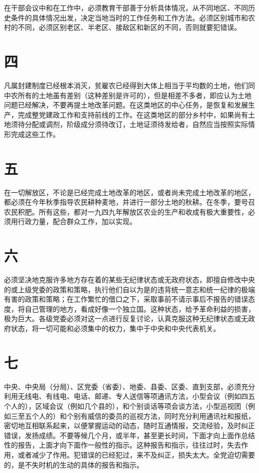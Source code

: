 在干部会议中和在工作中，必须教育干部善于分析具体情况，从不同地区、不同历史条件的具体情况出发，决定当地当时的工作任务和工作方法。必须区别城市和农村的不同，必须区别老区、半老区、接敌区和新区的不同，否则就要犯错误。

\section*{四}

凡属封建制度已经根本消灭，贫雇农已经得到大体上相当于平均数的土地，他们同中农所有的土地虽有差别（这种差别是许可的），但是相差不多者，即应认为土地问题已经解决，不要再提土地改革问题。在这类地区的中心任务，是恢复和发展生产，完成整党建政工作和支持前线的工作。在这类地区的部分乡村中，如果尚有土地须待分配或调剂，阶级成分须待改订，土地证须待发给者，自然应当按照实际情形完成这些工作。

\section*{五}

在一切解放区，不论是已经完成土地改革的地区，或者尚未完成土地改革的地区，都必须在今年秋季指导农民耕种麦地，并进行一部分土地的秋耕。在冬季，要号召农民积肥。所有这些，都对一九四九年解放区农业的生产和收成有极大重要性，必须用行政力量，配合群众工作，加以实现。

\section*{六}

必须坚决地克服许多地方存在着的某些无纪律状态或无政府状态，即擅自修改中央的或上级党委的政策和策略，执行他们自以为是的违背统一意志和统一纪律的极端有害的政策和策略；在工作繁忙的借口之下，采取事前不请示事后不报告的错误态度，将自己管理的地方，看成好像一个独立国。这种状态，给予革命利益的损害，极为巨大。各级党委必须对这一点进行反复讨论，认真克服这种无纪律状态或无政府状态，将一切可能和必须集中的权力，集中于中央和中央代表机关。

\section*{七}

中央、中央局（分局）、区党委（省委）、地委、县委、区委、直到支部，必须充分利用无线电、有线电、电话、邮递、专人送信等项通讯方法，小型会议（例如四五个人的），区域会议（例如几个县的），和个别谈话等项会谈方法，小型巡视团（例如三至五个人的）和个别有威信的委员的巡视方法，同时充分利用通讯社和报纸，密切地互相联系起来，以便掌握运动的动态，随时互通情报，交流经验，及时纠正错误，发扬成绩。不要等候几个月，或半年，甚至更长时间，下面才向上面作总结性的报告，上面才向下面作一般性的指示。这种报告和指示，往往过时，失去作用，或者减少了作用。犯错误的已经犯过，来不及纠正，损失太大。全党迫切需要的，是不失时机的生动的具体的报告和指示。

